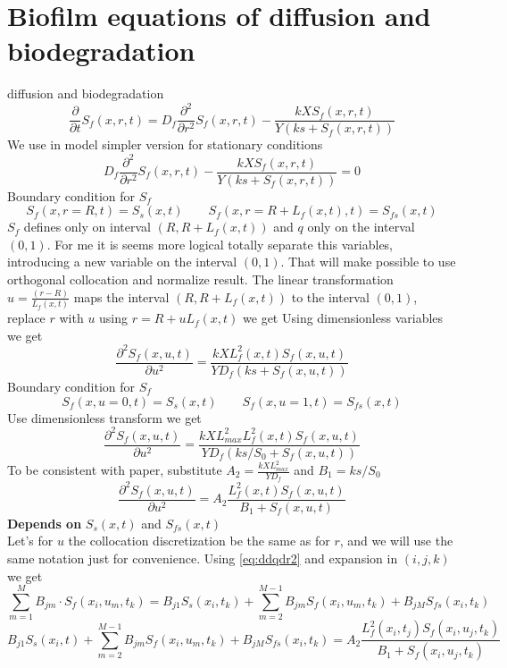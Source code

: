 \documentclass[12pt]{article}
\begin{document}
\section{Biofilm equations of diffusion and biodegradation}
diffusion and biodegradation
\begin{equation}
{\frac {\partial }{\partial t}}S_f(x,r,t) =D_f\frac{\partial ^{2}}{\partial {r}^2}S_f(x,r,t) - \frac {k X S_f(x,r,t)}{Y({ks}+S_f(x,r,t))}
\end{equation}
We use in model simpler version for stationary conditions
\begin{equation}
D_f\frac{\partial ^{2}}{\partial {r}^2}S_f(x,r,t) - \frac {k X S_f(x,r,t)}{Y({ks}+S_f(x,r,t))} = 0
\end{equation}
Boundary condition for $S_f$
\begin{equation}\label{eq:SfB}
S_f(x,r=R,t)=S_s(x, t) \qquad S_f(x,r=R+L_f(x,t),t) = S_{fs}(x, t) 
\end{equation}
$S_f$ defines only on interval $(R, R+L_f(x,t))$ and $q$ only on the interval $(0, 1)$. For me it is seems more logical totally separate this variables, introducing a new variable on the interval $(0,1)$. That will make possible to use orthogonal collocation and normalize result. The linear transformation $u=\frac{(r - R)}{L_f(x,t)}$ maps the interval $(R, R+L_f(x,t))$ to the interval $(0,1)$, replace $r$ with $u$ using $r=R+uL_f(x,t)$ we get Using dimensionless variables we get\\
\begin{equation}
\frac{\partial^2 S_f(x,u,t)}{\partial u^2}=\frac{kXL_f^2(x,t)S_f(x,u,t)}{YD_f(ks+S_f(x,u,t))}
\end{equation}
Boundary condition for $S_f$
\begin{equation}\label{eq:SfBu}
S_f(x,u=0,t)=S_s(x, t) \qquad S_f(x,u=1,t) = S_{fs}(x, t) 
\end{equation}
Use dimensionless transform we get
\begin{equation}
\frac{\partial^2 S_f(x,u,t)}{\partial u^2}=\frac{kXL^2_{max}L_f^2(x,t)S_f(x,u,t)}{YD_f(ks/S_0+S_f(x,u,t))}
\end{equation}
To be consistent with paper, substitute $A_2=\frac{kXL^2_{max}}{YD_f}$ and $B_1=ks/S_0$
\begin{equation}
\frac{\partial^2 S_f(x,u,t)}{\partial u^2}=A_2\frac{L_f^2(x,t)S_f(x,u,t)}{B_1+S_f(x,u,t)}
\end{equation}
\textbf{Depends on} $S_s(x,t)$ and $S_{fs}(x,t)$\\
Let's for $u$ the collocation discretization be the same as for $r$, and we will use the same notation just for convenience. Using \eqref{eq:ddqdr2} and expansion in $(i,j,k)$ we get
\begin{equation}
\sum_{m=1}^MB_{jm}\cdot S_f(x_i,u_m,t_k)= B_{j1}S_s(x_i, t_k) + \sum_{m=2}^{M-1}B_{jm}S_f(x_i,u_m,t_k)+B_{jM}S_{fs}(x_i, t_k)
\end{equation}
\begin{equation}
B_{j1}S_s(x_i, t) + \sum_{m=2}^{M-1}B_{jm}S_f(x_i,u_m,t_k)+B_{jM}S_{fs}(x_i, t_k)=A_2\frac{L_f^2(x_i,t_j)S_f(x_i,u_j,t_k)}{B_1+S_f(x_i,u_j,t_k)}
\end{equation}
\end{document}
